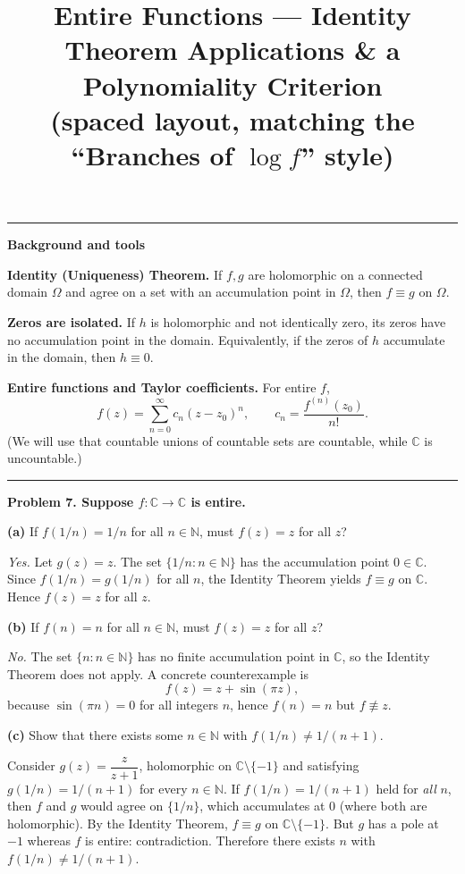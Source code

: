 \documentclass[12pt,a4paper]{article}
\title{\Large Entire Functions — Identity Theorem Applications \& a Polynomiality Criterion\\[0.3em]
	\large (spaced layout, matching the “Branches of $\log f$” style)}
\author{}
\date{}
\newcommand{\secdiv}{\par\vspace{0.6em}\hrule\par\vspace{0.8em}}
\newcommand{\subhead}[1]{\par\textbf{#1}\par\vspace{0.35em}}
\begin{document}
	\maketitle
	\secdiv
	
	\subhead{Background and tools}
	
	\textbf{Identity (Uniqueness) Theorem.}
	If $f,g$ are holomorphic on a connected domain $\Omega$ and agree on a set with an accumulation point in $\Omega$, then $f\equiv g$ on $\Omega$.
	
	\textbf{Zeros are isolated.}
	If $h$ is holomorphic and not identically zero, its zeros have no accumulation point in the domain. Equivalently, if the zeros of $h$ accumulate in the domain, then $h\equiv 0$.
	
	\textbf{Entire functions and Taylor coefficients.}
	For entire $f$,
	\[
	f(z)=\sum_{n=0}^{\infty} c_n (z-z_0)^n,
	\qquad
	c_n=\frac{f^{(n)}(z_0)}{n!}.
	\]
	(We will use that countable unions of countable sets are countable, while $\mathbb C$ is uncountable.)
	
	\secdiv
	
	\subhead{Problem 7. \; Suppose $f:\mathbb C\to\mathbb C$ is entire.}
	
	\textbf{(a)} If $f(1/n)=1/n$ for all $n\in\mathbb N$, must $f(z)=z$ for all $z$?
	
	\emph{Yes.} Let $g(z)=z$. The set $\{1/n:n\in\mathbb N\}$ has the accumulation point $0\in\mathbb C$.
	Since $f(1/n)=g(1/n)$ for all $n$, the Identity Theorem yields $f\equiv g$ on $\mathbb C$.
	Hence $f(z)=z$ for all $z$.
	
	\medskip
	
	\textbf{(b)} If $f(n)=n$ for all $n\in\mathbb N$, must $f(z)=z$ for all $z$?
	
	\emph{No.} The set $\{n:n\in\mathbb N\}$ has no finite accumulation point in $\mathbb C$,
	so the Identity Theorem does not apply. A concrete counterexample is
	\[
	f(z)=z+\sin(\pi z),
	\]
	because $\sin(\pi n)=0$ for all integers $n$, hence $f(n)=n$ but $f\not\equiv z$.
	
	\medskip
	
	\textbf{(c)} Show that there exists some $n\in\mathbb N$ with $f(1/n)\neq 1/(n+1)$.
	
	Consider $g(z)=\dfrac{z}{z+1}$, holomorphic on $\mathbb C\setminus\{-1\}$ and satisfying
	$g(1/n)=1/(n+1)$ for every $n\in\mathbb N$.
	If $f(1/n)=1/(n+1)$ held for \emph{all} $n$, then $f$ and $g$ would agree on $\{1/n\}$,
	which accumulates at $0$ (where both are holomorphic). By the Identity Theorem,
	$f\equiv g$ on $\mathbb C\setminus\{-1\}$. But $g$ has a pole at $-1$ whereas $f$ is entire:
	contradiction. Therefore there exists $n$ with $f(1/n)\neq 1/(n+1)$.
	
\end{document}
